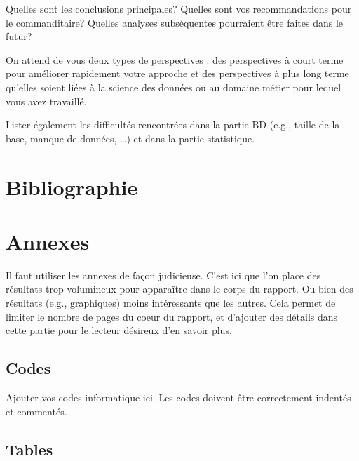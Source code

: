 \documentclass[mstat,12pt]{unswthesis}
\begin{document}
Quelles sont les conclusions principales? Quelles sont vos
recommandations pour le commanditaire? Quelles analyses subséquentes
pourraient être faites dans le futur?

\bigskip

On attend de vous deux types de perspectives : des perspectives à court
terme pour améliorer rapidement votre approche et des perspectives à
plus long terme qu'elles soient liées à la science des données ou au
domaine métier pour lequel vous avez travaillé.

\bigskip

Lister également les difficultés rencontrées dans la partie BD (e.g.,
taille de la base, manque de données, \ldots) et dans la partie
statistique.

\chapter*{Bibliographie}\label{bibliographie}

\label{refs}
\begin{CSLReferences}{0}{1}
\end{CSLReferences}




\chapter*{Annexes}\label{annexes}

Il faut utiliser les annexes de façon judicieuse. C'est ici que l'on
place des résultats trop volumineux pour apparaître dans le corps du
rapport. Ou bien des résultats (e.g., graphiques) moins intéressants que
les autres. Cela permet de limiter le nombre de pages du coeur du
rapport, et d'ajouter des détails dans cette partie pour le lecteur
désireux d'en savoir plus.

\section*{\texorpdfstring{\textbf{Codes}}{Codes}}\label{codes}

Ajouter vos codes informatique ici. Les codes doivent être correctement
indentés et commentés.

\section*{\texorpdfstring{\textbf{Tables}}{Tables}}\label{tables}
\end{document}
